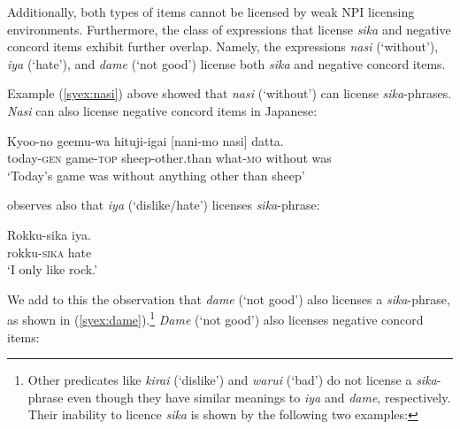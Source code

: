 \documentclass[output=paper]{langscibook}
\begin{document}
\z




Additionally, both types of items cannot be licensed by weak NPI licensing environments. Furthermore, the class of expressions that license \emph{sika} and negative concord items exhibit further overlap. Namely, the expressions \emph{nasi} (`without'), \emph{iya} (`hate'), and \emph{dame} (`not good') license both \emph{sika} and negative concord items.

Example (\ref{syex:nasi}) above showed that \emph{nasi} (`without') can license \emph{sika}-phrases.  \emph{Nasi} can also license negative concord items in Japanese:

\ea \gll Kyoo-no geemu-wa hituji-igai [nani-mo nasi] datta.\\
today-\textsc{gen} game-\textsc{top} sheep-other.than what-\textsc{mo} without was\\
\glt `Today's game was without anything other than sheep'\z


\citet{hasegawa11a} observes also that \emph{iya} (`dislike/hate')  licenses \emph{sika}-phrase:

\ea \gll Rokku-sika iya.\\
rokku-\textsc{sika} hate \\
\glt `I only like rock.'\z

We add to this the observation that  \emph{dame} (`not good') also licenses a \emph{sika}-phrase, as shown in (\ref{syex:dame}).\footnote{Other predicates like \emph{kirai} (`dislike') and \emph{warui} (`bad') do not license a \emph{sika}-phrase even though they have similar meanings to \emph{iya} and \emph{dame}, respectively.
Their inability to licence \emph{sika} is shown by the following two examples:

\z
}
\emph{Dame} (`not good') also licenses negative concord items:
\end{document}
